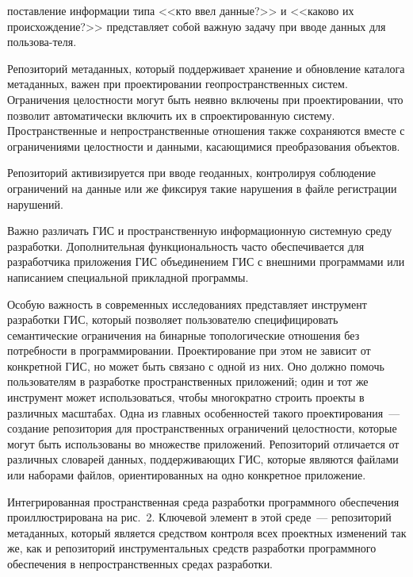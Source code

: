\begin{multicols}{2}
\noindent
поставление информации типа <<кто 
ввел данные?>> и <<каково их происхождение?>> представляет собой важную задачу при 
вводе данных для пользова-\linebreak теля. 
      
      Репозиторий метаданных, который поддерживает хранение и обновление каталога 
метаданных, важен при проектировании геопространственных систем. Ограничения 
целостности могут быть неявно включены при проектировании, что позволит 
автоматически включить их в спроектированную систему. Пространственные и 
непространственные отношения также сохраняются вместе с ограничениями целостности и 
данными, касающимися преобразования объектов. 
      
      Репозиторий активизируется при вводе геоданных, контролируя соблюдение 
ограничений на данные или же фиксируя такие нарушения в файле регистрации 
нарушений.
      
      Важно различать ГИС и пространственную инфор\-ма\-ци\-он\-ную системную среду 
разработки. Дополнительная функциональность часто обеспечивается для разработчика 
приложения ГИС объединением ГИС с внешними программами или написанием 
специальной прикладной программы. 

Особую важность в современных исследованиях 
представляет инструмент разработки ГИС, который позволяет пользователю 
специфицировать семантические ограничения на бинарные топологические отношения без 
потребности в программировании. Проектирование при этом не зависит от конкретной 
ГИС, но может быть связано с одной из них. Оно должно помочь пользователям в 
разработке пространственных приложений; один и тот же инструмент может 
использоваться, чтобы многократно строить проекты в различных масштабах. Одна из 
главных особенностей такого проектирования~--- создание репозитория для 
пространственных ограничений целостности, которые могут быть использованы во 
множестве приложений. Репозиторий отличается от различных словарей данных, 
поддерживающих ГИС, которые являются файлами или наборами файлов, 
ориентированных на одно конкретное приложение. 

Интегрированная пространственная 
среда разработки программного обеспечения проиллюстрирована на рис.~2. Ключевой 
элемент в этой среде~--- репозиторий метаданных, который является средством контроля 
всех проектных изменений так же, как и репозиторий инструментальных средств 
разработки программного обеспечения в непространственных средах разработки. 

\begin{figure*} %
 \vspace*{1pt}
 \begin{center}
 \mbox{%
 \epsfxsize=150.726mm
 }
 \end{center}
 \vspace*{-9pt}
\end{figure*}


\end{multicols}
